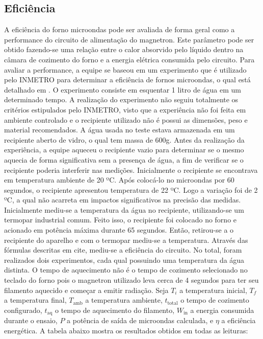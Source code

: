 \subsection{Eficiência}
A eficiência do forno microondas pode ser avaliada de forma geral como a performance do circuito de alimentação do magnetron. Este parâmetro pode ser obtido fazendo-se uma relação entre o calor absorvido pelo líquido dentro na câmara de cozimento do forno e a energia elétrica consumida pelo circuito.
Para avaliar a performance, a equipe se baseou em um experimento que é utilizado pelo INMETRO para determinar a eficiência de fornos microondas, o qual está detalhado em \cite{Inmetro}. O experimento consiste em esquentar 1 litro de água em um determinado tempo. A realização do experimento não seguiu totalmente os critérios estipulados pelo INMETRO, visto que a experiência não foi feita em ambiente controlado e o recipiente utilizado não é possui as dimensões, peso e material recomendados. A água usada no teste estava armazenada em um recipiente aberto de vidro, o qual tem massa de 600g. Antes da realização da experiência, a equipe aqueceu o recipiente vazio para determinar se o mesmo aquecia de forma significativa sem a presença de água, a fim de verificar se o recipiente poderia interferir nas medições. Inicialmente o recipiente se encontrava em temperatura ambiente de 20 ºC. Após colocá-lo no microondas por 60 segundos, o recipiente apresentou temperatura de 22 ºC. Logo a variação foi de 2 ºC, a qual não acarreta em impactos significativos na precisão das medidas.
Inicialmente mediu-se a temperatura da água no recipiente, utilizando-se um termopar industrial comum. Feito isso, o recipiente foi colocado no forno e acionado em potência máxima durante 65 segundos. Então, retirou-se a o recipiente do aparelho e com o termopar mediu-se a temperatura. Através das fórmulas descritas em cite, mediu-se a eficiência do circuito. No total, foram realizados dois experimentos, cada qual possuindo uma temperatura da água distinta. O tempo de aquecimento não é o tempo de cozimento selecionado no teclado do forno pois o magnetron utilizado leva cerca de 4 segundos para ter seu filamento aquecido e começar a emitir radiação. Seja $T_i$ a temperatura inicial, $T_f$ a temperatura final, $T_\mathrm{amb}$ a temperatura ambiente, $t_\mathrm{total}$ o tempo de cozimento configurado, $t_\mathrm{aq}$  o tempo de aquecimento do filamento,  $W_\mathrm{in}$ a energia consumida durante o ensaio, $P$ a potência de saída de microondas calculada, e $\eta$ a eficiência energética. A tabela abaixo mostra os resultados obtidos em todas as leituras:
